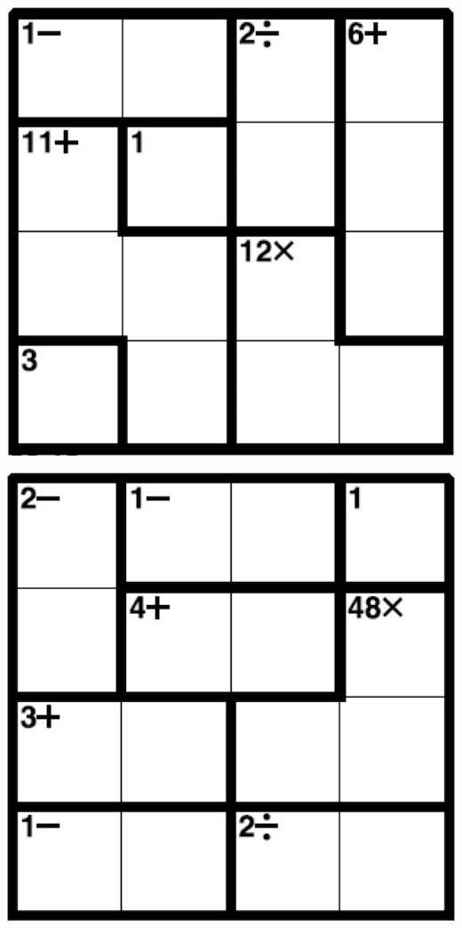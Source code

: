 
\includegraphics[scale=1]{Gambar/Lampiran/4x4_29.png}

\includegraphics[scale=1]{Gambar/Lampiran/4x4_30.png}
